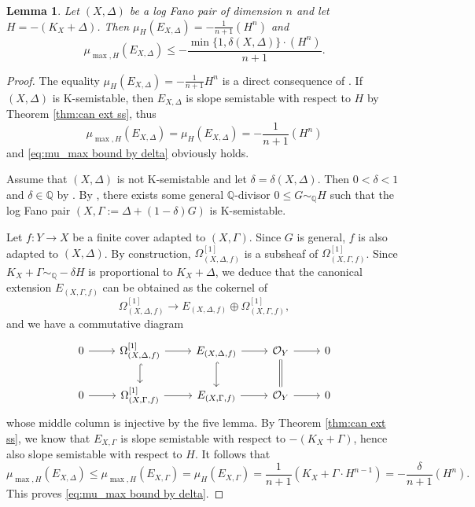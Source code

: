 \documentclass[12pt]{amsart}
\newtheorem{lem}[prop]{Lemma}
\theoremstyle{definition}
\newcommand{\bQ}{\mathbb{Q}}
\newcommand{\cO}{\mathcal{O}}
\numberwithin{equation}{section}
\begin{document}
\begin{lem} \label{lem:mu_max bound by delta}
Let $(X,\Delta)$ be a log Fano pair of dimension $n$ and let $H=-(K_X+\Delta)$. Then $\mu_H(E_{X,\Delta})=-\frac{1}{n+1}(H^n)$ and
\begin{equation} \label{eq:mu_max bound by delta}
\mu_{\max,H}(E_{X,\Delta})\le -\frac{\min\{1,\delta(X,\Delta)\}\cdot (H^n)}{n+1}.
\end{equation}
\end{lem}

\begin{proof}
The equality $\mu_H(E_{X,\Delta})=-\frac{1}{n+1}H^n$ is a direct consequence of \cite[Corollary 3.9]{CKT-hyperbolicity}. If $(X,\Delta)$ is K-semistable, then $E_{X,\Delta}$ is slope semistable with respect to $H$ by Theorem \ref{thm:can ext ss}, thus 
\[
\mu_{\max,H}(E_{X,\Delta}) = \mu_{H}(E_{X,\Delta}) = -\frac{1}{n+1}(H^n)
\]
and \eqref{eq:mu_max bound by delta} obviously holds. 

Assume that $(X,\Delta)$ is not K-semistable and let $\delta=\delta(X,\Delta)$. Then $0<\delta<1$ and $\delta\in \bQ$ by \cite[Theorem 5.1]{LXZ-HRFG}. By \cite[Theorem 1.8]{LXZ-HRFG}, there exists some general $\bQ$-divisor $0\le G\sim_{\bQ} H$ such that the log Fano pair $(X,\Gamma:=\Delta+(1-\delta)G)$ is K-semistable. 

Let $f\colon Y\to X$ be a finite cover adapted to $(X,\Gamma)$. Since $G$ is general, $f$ is also adapted to $(X,\Delta)$. By construction, $\Omega^{[1]}_{(X,\Delta,f)}$ is a subsheaf of $\Omega^{[1]}_{(X,\Gamma,f)}$. Since $K_X+\Gamma\sim_{\bQ} -\delta H$ is proportional to $K_X+\Delta$, we deduce that the canonical extension $E_{(X,\Gamma,f)}$ can be obtained as the cokernel of 
\[
\Omega^{[1]}_{(X,\Delta,f)} \to E_{(X,\Delta,f)} \oplus \Omega^{[1]}_{(X,\Gamma,f)},
\]
and we have a commutative diagram
\[
\begin{tikzcd}
0 \arrow[r] & \Omega^{[1]}_{(X,\Delta,f)} \arrow[r] \arrow[d, hook] & E_{(X,\Delta,f)} \arrow[r] \arrow[d, hook] & \cO_Y \arrow[r] \arrow[d, equal] & 0 \\
0 \arrow[r] & \Omega^{[1]}_{(X,\Gamma,f)} \arrow[r] & E_{(X,\Gamma,f)} \arrow[r] & \cO_Y \arrow[r] & 0
\end{tikzcd}
\]
whose middle column is injective by the five lemma. By Theorem \ref{thm:can ext ss}, we know that $E_{X,\Gamma}$ is slope semistable with respect to $-(K_X+\Gamma)$, hence also slope semistable with respect to $H$.  It follows that
\[
\mu_{\max,H}(E_{X,\Delta})\le \mu_{\max,H}(E_{X,\Gamma}) = \mu_H (E_{X,\Gamma}) = \frac{1}{n+1}(K_X+\Gamma\cdot H^{n-1}) = -\frac{\delta}{n+1}(H^n).
\]
This proves \eqref{eq:mu_max bound by delta}.
\end{proof}
\end{document}
